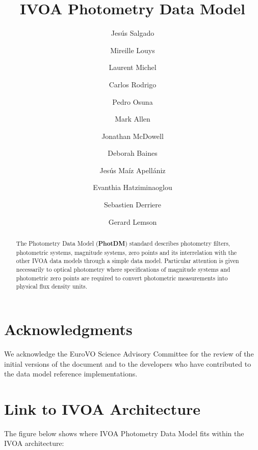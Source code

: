 \documentclass[11pt,a4paper]{ivoa}
\title{IVOA Photometry Data Model}
\author{Jesús Salgado}
\author{Mireille Louys}
\author{Laurent Michel}
\author{Carlos Rodrigo}
\author{Pedro Osuna}
\author{Mark Allen}
\author{Jonathan McDowell}
\author{Deborah Baines}
\author{Jesús Maíz Apellániz}
\author{Evanthia Hatziminaoglou}
\author{Sebastien \mbox{Derriere}}
\author{Gerard Lemson}
\begin{document}
\begin{abstract}
The Photometry Data Model (\textbf{PhotDM}) standard describes photometry
filters, photometric systems, magnitude systems, zero points and its
interrelation with the other IVOA data models through a simple data model.
Particular attention is given necessarily to optical photometry where
specifications of magnitude systems and photometric zero points are required
to convert photometric measurements into physical flux density units.
\end{abstract}

\section*{Acknowledgments}
We acknowledge the EuroVO Science Advisory Committee for the review of the
initial versions of the document and to the developers who have contributed
to the data model reference implementations.
\pagebreak

\section*{Link to IVOA Architecture}
The figure below shows where IVOA Photometry Data Model fits within the
IVOA architecture:


\end{document}
